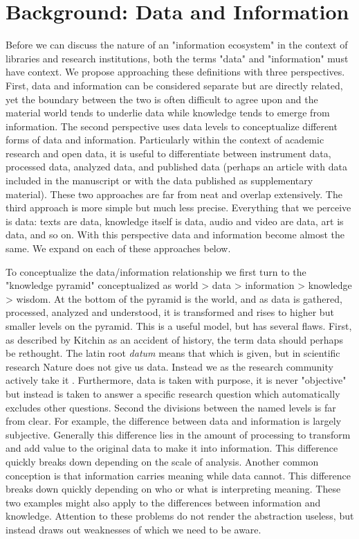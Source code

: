 \section{Background: Data and Information}

Before we can discuss the nature of an "information ecosystem" in the context of libraries and research institutions, both the terms "data" and "information" must have context. We propose approaching these definitions with three perspectives. First, data and information can be considered separate but are directly related, yet the boundary between the two is often difficult to agree upon and the material world tends to underlie data while knowledge tends to emerge from information. The second perspective uses data levels to conceptualize different forms of data and information. Particularly within the context of academic research and open data, it is useful to differentiate between instrument data, processed data, analyzed data, and published data (perhaps an article with data included in the manuscript or with the data published as supplementary material). These two approaches are far from neat and overlap extensively. The third approach is more simple but much less precise. Everything that we perceive is data: texts are data, knowledge itself is data, audio and video are data, art is data, and so on. With this perspective data and information become almost the same. We expand on each of these approaches below.

To conceptualize the data/information relationship we first turn to the "knowledge pyramid" conceptualized as world > data > information > knowledge > wisdom. At the bottom of the pyramid is the world, and as data is gathered, processed, analyzed and understood, it is transformed and rises to higher but smaller levels on the pyramid. This is a useful model, but has several flaws. First, as described by Kitchin as an accident of history, the term data should perhaps be rethought. The latin root \textit{datum} means that which is given, but in scientific research Nature does not give us data. Instead we as the research community actively take it \cite{kitchin_2014}. Furthermore, data is taken with purpose, it is never "objective" but instead is taken to answer a specific research question which automatically excludes other questions. Second the divisions between the named levels is far from clear. For example, the difference between data and information is largely subjective. Generally this difference lies in the amount of processing to transform and add value to the original data to make it into information. This difference quickly breaks down depending on the scale of analysis. Another common conception is that information carries meaning while data cannot. This difference breaks down quickly depending on who or what is interpreting meaning. These two examples might also apply to the differences between information and knowledge. Attention to these problems do not render the abstraction useless, but instead draws out weaknesses of which we need to be aware.

